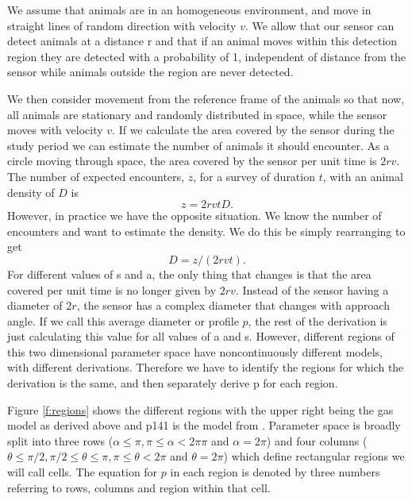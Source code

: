 \documentclass[a4paper,10pt,reqno,oneside]{amsart}
\begin{document}
We assume that animals are in an homogeneous environment, and move in straight lines of random direction with velocity $v$. We allow that our sensor can detect animals at a distance r and that if an animal moves within this detection region they are detected with a probability of 1, independent of distance from the sensor while animals outside the region are never detected.

We then consider movement from the reference frame of the animals so that now, all animals are stationary and randomly distributed in space, while the sensor moves with velocity $v$. If we calculate the area covered by the sensor during the study period we can estimate the number of animals it should encounter. As a circle moving through space, the area covered by the sensor per unit time is $2rv$. The number of expected encounters, $z$, for a survey of duration $t$, with an animal density of $D$ is
\begin{equation}
	z = 2rvtD.
\end{equation}
However, in practice we have the opposite situation. We know the number of encounters and want to estimate the density. We do this be simply rearranging to get
\begin{equation}
	D = z/(2rvt).
\end{equation}
For different values of s and a, the only thing that changes is that the area covered per unit time is no longer given by $2rv$. Instead of the sensor having a diameter of $2r$, the sensor has a complex diameter that changes with approach angle. If we call this average diameter or profile $p$, the rest of the derivation is just calculating this value for all values of a and s. However, different regions of this two dimensional parameter space have noncontinuously different models, with different derivations. Therefore we have to identify the regions for which the derivation is the same, and then separately derive p for each region.

Figure \ref{f:regions} shows the different regions with the upper right being the gas model as derived above and p141 is the model from \citep{rowcliffe2008estimating}. Parameter space is broadly split into three rows ($ \alpha \le \pi, \pi \le \alpha < 2π\pi$ and $ \alpha = 2\pi$) and four columns ($ \theta \le \pi/2,  \pi/2 \le \theta \le  \pi,  \pi \le \theta < 2\pi$ and $\theta = 2\pi$) which define rectangular regions we will call cells. The equation for $p$ in each region is denoted by three numbers referring to rows, columns and region within that cell. 
\end{document}
